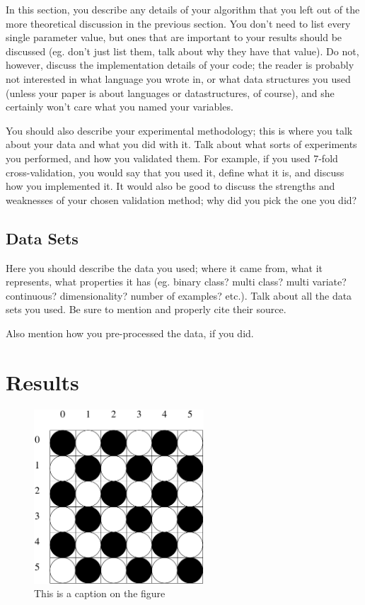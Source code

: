 \documentclass[12pt, letterpaper]{article}
\begin{document}
In this section, you describe any details of your algorithm that you left out of
the more theoretical discussion in the previous section.  You don't need to list
every single parameter value, but ones that are important to your results should
be discussed (eg. don't just list them, talk about why they have that value).
Do not, however, discuss the implementation details of your code; the reader is
probably not interested in what language you wrote in, or what data structures
you used (unless your paper is about languages or datastructures, of course),
and she certainly won't care what you named your variables.

You should also describe your experimental methodology; this is where you talk
about your data and what you did with it.  Talk about what sorts of experiments
you performed, and how you validated them.  For example, if you used 7-fold
cross-validation, you would say that you used it, define what it is, and discuss
how you implemented it.  It would also be good to discuss the strengths and
weaknesses of your chosen validation method; why did you pick the one you did?

\subsection*{Data Sets}
Here you should describe the data you used; where it came from, what it
represents, what properties it has (eg. binary class? multi class? multi
variate? continuous? dimensionality? number of examples? etc.).  Talk about all
the data sets you used.  Be sure to mention and properly cite their source.

Also mention how you pre-processed the data, if you did.


\section{Results}
\begin{figure}
\begin{center}
\includegraphics[width=2.5in]{images/konane1.pdf}
\end{center}
\caption{This is a caption on the figure}
\label{somefigure}
\end{figure}
\end{document}
